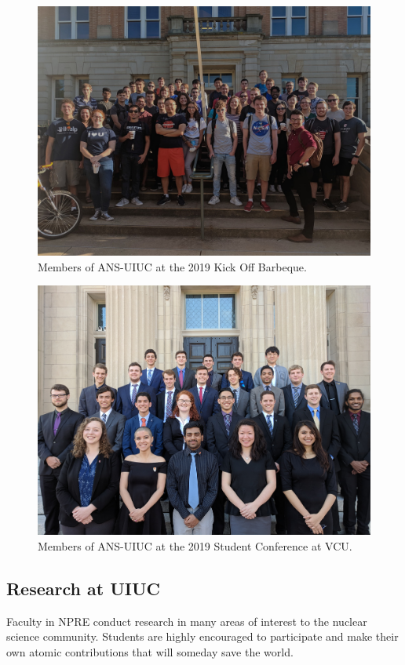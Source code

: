 \documentclass[12pt, letterpaper]{article}
\begin{document}
\begin{figure}[H]
  \centering
  \includegraphics[width=12cm]{ans_uiuc_group.jpg}
  \caption{Members of ANS-UIUC at the 2019 Kick Off Barbeque.}
\end{figure}

\begin{figure}[H]
  \centering
  \includegraphics[width=12cm]{ans_conf_19.jpg}
  \caption{Members of ANS-UIUC at the 2019 Student Conference at VCU.}
\end{figure}

\subsection{Research at UIUC}
Faculty in NPRE conduct research in many areas of interest to the nuclear science community. Students are highly encouraged to participate and make their own atomic contributions that will someday save the world.
\end{document}
